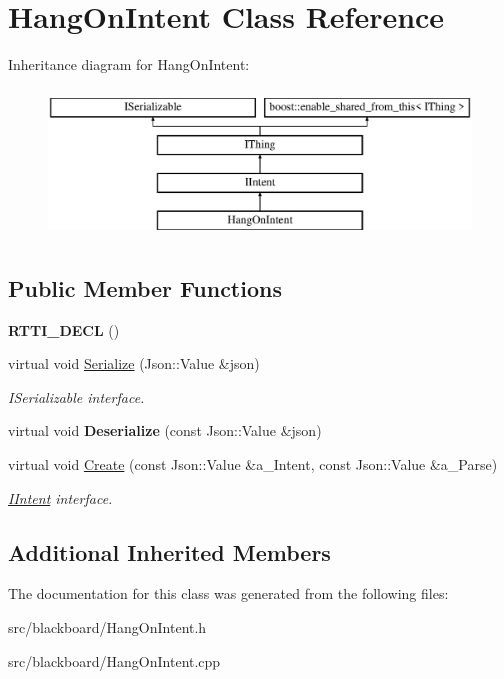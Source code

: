 \hypertarget{class_hang_on_intent}{}\section{Hang\+On\+Intent Class Reference}
\label{class_hang_on_intent}
Inheritance diagram for Hang\+On\+Intent\+:\begin{figure}[H]
\begin{center}
\leavevmode
\includegraphics[height=4.000000cm]{class_hang_on_intent}
\end{center}
\end{figure}
\subsection*{Public Member Functions}
\begin{DoxyCompactItemize}
\item 
\mbox{\label{class_hang_on_intent_a6aae7586d857c51ab5750e22fea02a53}} 
{\bfseries R\+T\+T\+I\+\_\+\+D\+E\+CL} ()
\item 
\mbox{\label{class_hang_on_intent_a719fd82c385db7900d4357ca61382a2a}} 
virtual void \hyperlink{class_hang_on_intent_a719fd82c385db7900d4357ca61382a2a}{Serialize} (Json\+::\+Value \&json)
\begin{DoxyCompactList}\small\item\em I\+Serializable interface. \end{DoxyCompactList}\item 
\mbox{\label{class_hang_on_intent_aaed7e275cd8aa7455498a72c8f1fc087}} 
virtual void {\bfseries Deserialize} (const Json\+::\+Value \&json)
\item 
\mbox{\label{class_hang_on_intent_a1607b79d7bbe5bed5768177186c69458}} 
virtual void \hyperlink{class_hang_on_intent_a1607b79d7bbe5bed5768177186c69458}{Create} (const Json\+::\+Value \&a\+\_\+\+Intent, const Json\+::\+Value \&a\+\_\+\+Parse)
\begin{DoxyCompactList}\small\item\em \hyperlink{class_i_intent}{I\+Intent} interface. \end{DoxyCompactList}\end{DoxyCompactItemize}
\subsection*{Additional Inherited Members}


The documentation for this class was generated from the following files\+:\begin{DoxyCompactItemize}
\item 
src/blackboard/Hang\+On\+Intent.\+h\item 
src/blackboard/Hang\+On\+Intent.\+cpp\end{DoxyCompactItemize}
